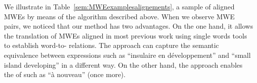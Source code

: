 \documentclass[output=paper,modfonts,nonflat]{langsci/langscibook}
\begin{document}
We illustrate in Table~\ref{sem:MWEexamplesalignements}, a sample of aligned MWEs by means of the algorithm described above.  When we observe MWE pairs, we noticed that our method has two advantages. On the one hand, it allows the translation of MWEs aligned in most previous work \citep{dagan1994termight,ren2009improving} using single words  tools to establish word-to- relations. 
The approach can capture the semantic equivalence between expressions such as ``insulaire en développement'' and ``small island developing'' in a different way.
 On the other hand, the approach enables the  of  such as ``à nouveau'' (once more). 

\end{document}
